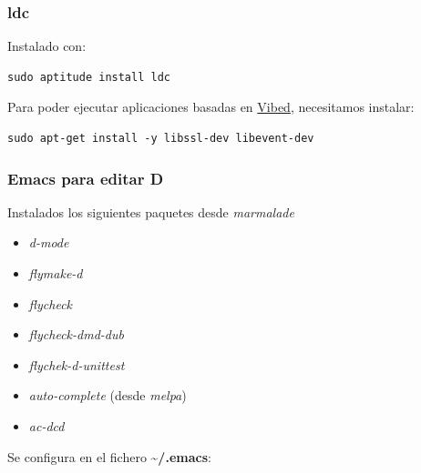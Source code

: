 \documentclass[12pt,spanish,]{scrartcl}
\providecommand{\tightlist}{%
  \setlength{\itemsep}{0pt}\setlength{\parskip}{0pt}}
\begin{document}
\subsubsection{ldc}\label{ldc}

Instalado con:

\begin{verbatim}
sudo aptitude install ldc
\end{verbatim}

Para poder ejecutar aplicaciones basadas en
\href{http://vibed.org/}{Vibed}, necesitamos instalar:

\begin{verbatim}
sudo apt-get install -y libssl-dev libevent-dev
\end{verbatim}

\subsubsection{Emacs para editar D}\label{emacs-para-editar-d}

Instalados los siguientes paquetes desde \emph{marmalade}

\begin{itemize}
\tightlist
\item
  \emph{d-mode}
\item
  \emph{flymake-d}
\item
  \emph{flycheck}
\item
  \emph{flycheck-dmd-dub}
\item
  \emph{flychek-d-unittest}
\item
  \emph{auto-complete} (desde \emph{melpa})
\item
  \emph{ac-dcd}
\end{itemize}

Se configura en el fichero \textbf{\textasciitilde{}/.emacs}:
\end{document}
